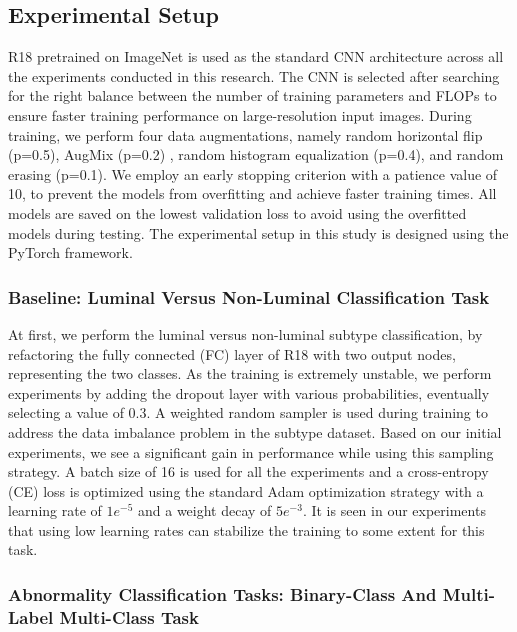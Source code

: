 \documentclass{article}
\begin{document}
\subsection{Experimental Setup}
 

R18 pretrained on ImageNet is used as the standard CNN architecture across all the experiments conducted in this research. The CNN is selected after searching for the right balance between the number of training parameters and FLOPs to ensure faster training performance on large-resolution input images. During training, we perform four data augmentations, namely random horizontal flip (p=0.5), AugMix (p=0.2) \cite{hendrycks2019augmix}, random histogram equalization (p=0.4), and random erasing (p=0.1). We employ an early stopping criterion with a patience value of 10, to prevent the models from overfitting and achieve faster training times. All models are saved on the lowest validation loss to avoid using the overfitted models during testing. The experimental setup in this study is designed using the PyTorch framework.  

  

\subsubsection{Baseline: Luminal Versus Non-Luminal Classification Task}  

  

\label {sub:baseline}  

  

At first, we perform the luminal versus non-luminal subtype classification, by refactoring the fully connected (FC) layer of R18 with two output nodes, representing the two classes. As the training is extremely unstable, we perform experiments by adding the dropout layer with various probabilities, eventually selecting a value of 0.3. A weighted random sampler is used during training to address the data imbalance problem in the subtype dataset. Based on our initial experiments, we see a significant gain in performance while using this sampling strategy. A batch size of 16 is used for all the experiments and a cross-entropy (CE) loss is optimized using the standard Adam optimization strategy with a learning rate of $1e^ {-5} $ and a weight decay of $5e^ {-3} $. It is seen in our experiments that using low learning rates can stabilize the training to some extent for this task.  

  

\subsubsection {Abnormality Classification Tasks: Binary-Class And Multi-Label Multi-Class Task}  
\end{document}
